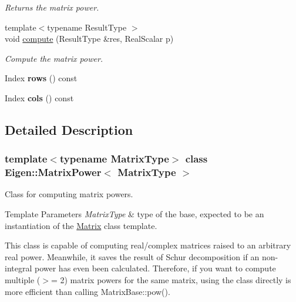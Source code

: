 \begin{DoxyCompactItemize}
\begin{DoxyCompactList}\small\item\em Returns the matrix power. \end{DoxyCompactList}\item 
{\footnotesize template$<$typename Result\+Type $>$ }\\void \hyperlink{class_eigen_1_1_matrix_power_aa1258393dc13acd6e401e000f99b915f}{compute} (Result\+Type \&res, Real\+Scalar p)
\begin{DoxyCompactList}\small\item\em Compute the matrix power. \end{DoxyCompactList}\item 
\mbox{\label{class_eigen_1_1_matrix_power_ade4446998c2e4d83278c426944b7b72b}} 
Index {\bfseries rows} () const
\item 
\mbox{\label{class_eigen_1_1_matrix_power_a2e8d572202d337a5d651781fbcd72bbf}} 
Index {\bfseries cols} () const
\end{DoxyCompactItemize}


\subsection{Detailed Description}
\subsubsection*{template$<$typename Matrix\+Type$>$\newline
class Eigen\+::\+Matrix\+Power$<$ Matrix\+Type $>$}

Class for computing matrix powers. 


\begin{DoxyTemplParams}{Template Parameters}
{\em Matrix\+Type} & type of the base, expected to be an instantiation of the \hyperlink{group___core___module_class_eigen_1_1_matrix}{Matrix} class template.\\
\hline
\end{DoxyTemplParams}
This class is capable of computing real/complex matrices raised to an arbitrary real power. Meanwhile, it saves the result of Schur decomposition if an non-\/integral power has even been calculated. Therefore, if you want to compute multiple ($>$= 2) matrix powers for the same matrix, using the class directly is more efficient than calling Matrix\+Base\+::pow().

